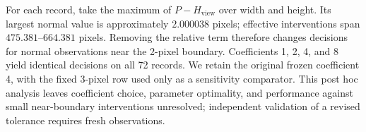 For each record, take the maximum of \(P-H_{\mathrm{view}}\) over width and height. Its largest normal value is approximately \(2.000038\) pixels; effective interventions span \(475.381\)--\(664.381\) pixels. Removing the relative term therefore changes decisions for normal observations near the 2-pixel boundary. Coefficients 1, 2, 4, and 8 yield identical decisions on all 72 records. We retain the original frozen coefficient 4, with the fixed 3-pixel row used only as a sensitivity comparator. This post hoc analysis leaves coefficient choice, parameter optimality, and performance against small near-boundary interventions unresolved; independent validation of a revised tolerance requires fresh observations.
